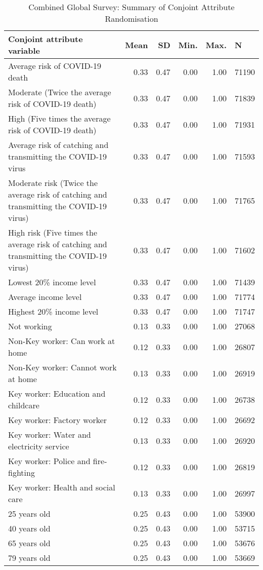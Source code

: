 \begin{sidewaystable}[ht]
\centering
\begin{tabular}{lrrrrl}
  \hline
Conjoint attribute variable & Mean & SD & Min. & Max. & N \\ 
  \hline
Average risk of COVID-19 death & 0.33 & 0.47 & 0.00 & 1.00 & 71190 \\ 
  Moderate (Twice the average risk of COVID-19 death) & 0.33 & 0.47 & 0.00 & 1.00 & 71839 \\ 
  High (Five times the average risk of COVID-19 death) & 0.33 & 0.47 & 0.00 & 1.00 & 71931 \\ 
  Average risk of catching and transmitting the COVID-19 virus & 0.33 & 0.47 & 0.00 & 1.00 & 71593 \\ 
  Moderate risk (Twice the average risk of catching and transmitting the COVID-19 virus) & 0.33 & 0.47 & 0.00 & 1.00 & 71765 \\ 
  High risk (Five times the average risk of catching and transmitting the COVID-19 virus) & 0.33 & 0.47 & 0.00 & 1.00 & 71602 \\ 
  Lowest 20\% income level & 0.33 & 0.47 & 0.00 & 1.00 & 71439 \\ 
  Average income level & 0.33 & 0.47 & 0.00 & 1.00 & 71774 \\ 
  Highest 20\% income level & 0.33 & 0.47 & 0.00 & 1.00 & 71747 \\ 
  Not working & 0.13 & 0.33 & 0.00 & 1.00 & 27068 \\ 
  Non-Key worker: Can work at home & 0.12 & 0.33 & 0.00 & 1.00 & 26807 \\ 
  Non-Key worker: Cannot work at home & 0.13 & 0.33 & 0.00 & 1.00 & 26919 \\ 
  Key worker: Education and childcare & 0.12 & 0.33 & 0.00 & 1.00 & 26738 \\ 
  Key worker: Factory worker & 0.12 & 0.33 & 0.00 & 1.00 & 26692 \\ 
  Key worker: Water and electricity service & 0.13 & 0.33 & 0.00 & 1.00 & 26920 \\ 
  Key worker: Police and fire-fighting & 0.12 & 0.33 & 0.00 & 1.00 & 26819 \\ 
  Key worker: Health and social care & 0.13 & 0.33 & 0.00 & 1.00 & 26997 \\ 
  25 years old & 0.25 & 0.43 & 0.00 & 1.00 & 53900 \\ 
  40 years old & 0.25 & 0.43 & 0.00 & 1.00 & 53715 \\ 
  65 years old & 0.25 & 0.43 & 0.00 & 1.00 & 53676 \\ 
  79 years old & 0.25 & 0.43 & 0.00 & 1.00 & 53669 \\ 
   \hline
\end{tabular}
\caption{Combined Global Survey: Summary of Conjoint Attribute Randomisation} 
\label{tab:randomisation}
\end{sidewaystable}
